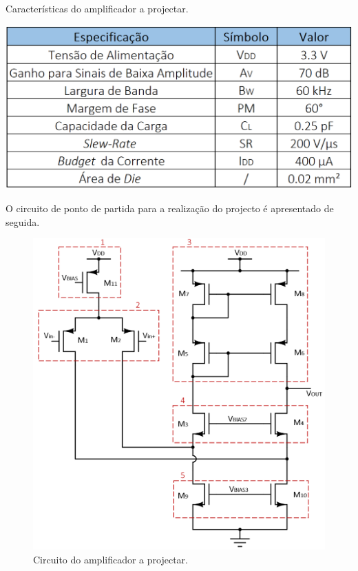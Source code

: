 \documentclass[11pt]{article}
\numberwithin{equation}{section}
\begin{document}
\begin{table}[H]
	\centering
	\caption{Características do amplificador a projectar.}
	\vspace{-1.5mm}
	\includegraphics[keepaspectratio=true, scale=0.45]{teoricas/tabela1}
	\label{tab:tab1}
\end{table}

O circuito de ponto de partida para a realização do projecto é apresentado de seguida.

\begin{figure}[H]
	\centering
	\includegraphics[keepaspectratio=true, scale=0.50]{teoricas/circuito1}
	\vspace{-0.5em}
	\caption{Circuito do amplificador a projectar.}
	\vspace{-0.8em}
\end{figure} 
\end{document}
